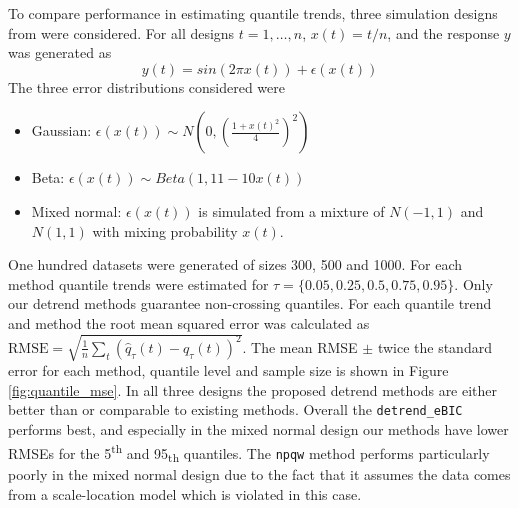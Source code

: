 \documentclass[12pt]{article}
\begin{document}
	To compare performance in estimating quantile trends, three simulation designs from \cite{Racine2017} were considered. For all designs $t = 1, \ldots, n$,  $x(t) = t/n$, and the response $y$ was generated as 
	$$y(t) = sin(2\pi x(t)) + \epsilon(x(t))$$
	The three error distributions considered were 
	\begin{itemize}
		\item Gaussian: $\epsilon(x(t)) \sim N\left(0, \left(\frac{1+x(t)^2}{4}\right)^2\right)$
		\item Beta: $\epsilon(x(t)) \sim Beta(1, 11-10x(t))$
		\item Mixed normal: $\epsilon(x(t))$ is simulated from a mixture of $N(-1,1)$ and  $N(1,1)$ with mixing probability $x(t)$.
	\end{itemize}
	
	One hundred datasets were generated of sizes 300, 500 and 1000. For each method quantile trends were estimated for $\tau = \{0.05, 0.25, 0.5, 0.75, 0.95\}$. Only our detrend methods guarantee non-crossing quantiles. For each quantile trend and method the root mean squared error was calculated as $\mbox{RMSE} = \sqrt{\frac{1}{n}\sum_t (\hat{q}_{\tau}(t) - q_\tau(t))^2}$. The mean RMSE $\pm$ twice the standard error for each method, quantile level and sample size is shown in Figure \ref{fig:quantile_mse}. 	In all three designs the proposed detrend methods are either better than or comparable to existing methods. Overall the \texttt{detrend\_eBIC} performs best, and especially in the mixed normal design our methods have lower RMSEs for the 5\textsuperscript{th} and 95\textsubscript{th} quantiles. The \texttt{npqw} method performs particularly poorly in the mixed normal design due to the fact that it assumes the data comes from a scale-location model which is violated in this case. 
	
\end{document}
